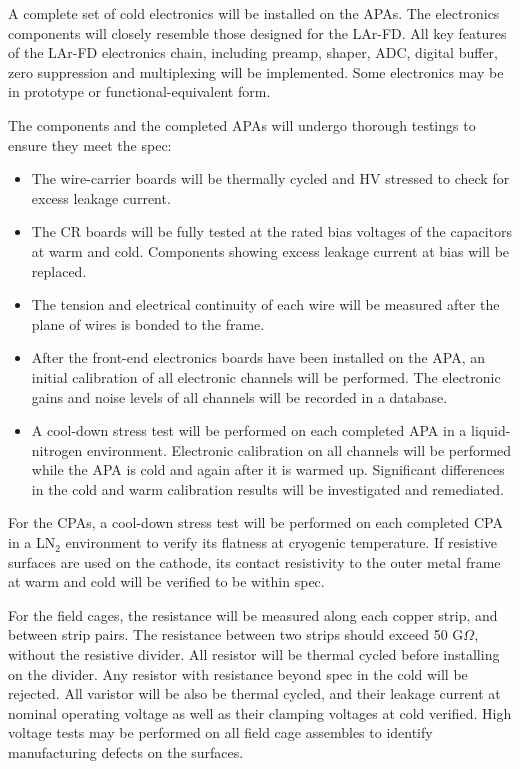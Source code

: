 A complete set of cold electronics will be installed on the APAs. The electronics components will closely resemble those designed for the LAr-FD. All key features of the LAr-FD electronics chain, including preamp, shaper, ADC, digital buffer, zero suppression and multiplexing will be implemented. Some electronics may be in prototype or functional-equivalent form.



The components and the completed APAs will undergo thorough testings to ensure they meet the spec:
\begin{itemize}

\item The wire-carrier boards will be thermally cycled and HV stressed to check for excess leakage current.
\item The CR boards will be fully tested at the rated bias voltages of the capacitors at warm and cold.  Components showing excess leakage current at bias will be replaced.
\item The tension and electrical continuity of each wire will be 
measured after the plane of wires is bonded to the frame.
\item After the front-end electronics boards have been installed on 
the APA, an initial calibration of all electronic channels will be 
performed.  The electronic gains and noise levels of all channels will be 
recorded in a database.
\item A cool-down stress test will be performed on each completed 
APA in a liquid-nitrogen environment.  Electronic calibration on 
all channels will be performed while the APA is cold and again
after it is warmed up.  Significant differences in the cold and warm calibration 
results will be investigated and remediated.  
\end{itemize}

For the CPAs, a cool-down stress test will be performed on each completed 
CPA in a LN$_2$ environment to verify its flatness at cryogenic temperature. If resistive surfaces are used on the cathode, its contact resistivity to the outer metal frame at warm and cold will be verified to be within spec. 

For the field cages,  the resistance will be measured along each copper strip,  
and between strip pairs.  The resistance between two 
strips should exceed 50 G$\Omega$, without the resistive divider.  All resistor will be thermal cycled before installing on the divider.  Any resistor with resistance beyond spec in the cold will be rejected. All varistor will be also be thermal cycled, and their leakage current at nominal operating voltage as well as their clamping voltages at cold verified.  High voltage tests may be performed on all field cage assembles to identify manufacturing defects on the surfaces. 

